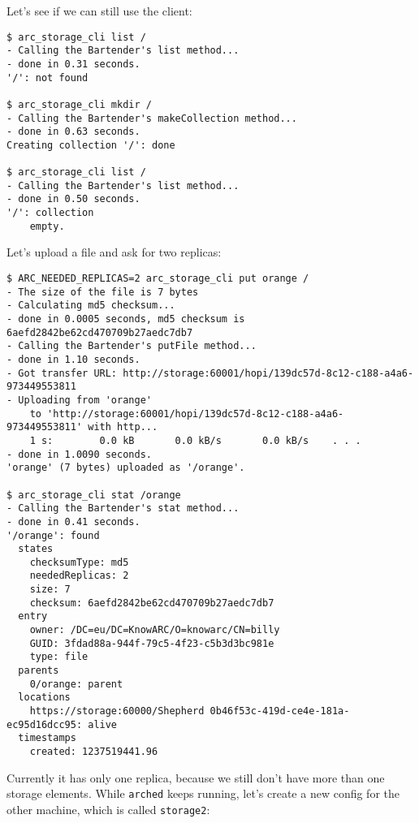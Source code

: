 \documentclass{book}
\begin{document}
Let's see if we can still use the client:

\begin{verbatim}
$ arc_storage_cli list /
- Calling the Bartender's list method...
- done in 0.31 seconds.
'/': not found

$ arc_storage_cli mkdir /
- Calling the Bartender's makeCollection method...
- done in 0.63 seconds.
Creating collection '/': done

$ arc_storage_cli list /
- Calling the Bartender's list method...
- done in 0.50 seconds.
'/': collection
    empty.
\end{verbatim}

Let's upload a file and ask for two replicas:

\begin{verbatim}
$ ARC_NEEDED_REPLICAS=2 arc_storage_cli put orange /
- The size of the file is 7 bytes
- Calculating md5 checksum...
- done in 0.0005 seconds, md5 checksum is 6aefd2842be62cd470709b27aedc7db7
- Calling the Bartender's putFile method...
- done in 1.10 seconds.
- Got transfer URL: http://storage:60001/hopi/139dc57d-8c12-c188-a4a6-973449553811
- Uploading from 'orange'
    to 'http://storage:60001/hopi/139dc57d-8c12-c188-a4a6-973449553811' with http...
    1 s:        0.0 kB       0.0 kB/s       0.0 kB/s    . . .       
- done in 1.0090 seconds.
'orange' (7 bytes) uploaded as '/orange'.

$ arc_storage_cli stat /orange
- Calling the Bartender's stat method...
- done in 0.41 seconds.
'/orange': found
  states
    checksumType: md5
    neededReplicas: 2
    size: 7
    checksum: 6aefd2842be62cd470709b27aedc7db7
  entry
    owner: /DC=eu/DC=KnowARC/O=knowarc/CN=billy
    GUID: 3fdad88a-944f-79c5-4f23-c5b3d3bc981e
    type: file
  parents
    0/orange: parent
  locations
    https://storage:60000/Shepherd 0b46f53c-419d-ce4e-181a-ec95d16dcc95: alive
  timestamps
    created: 1237519441.96
\end{verbatim}

Currently it has only one replica, because we still don't have more than one storage elements. While \verb!arched! keeps running, let's create a new config for the other machine, which is called \verb!storage2!:
\end{document}
